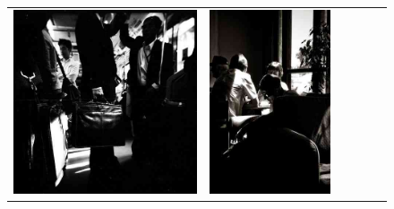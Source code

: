 \begin{figure}
\begin{tabular}{m{.01\linewidth} m{.16\linewidth} m{.16\linewidth} m{.16\linewidth} m{.16\linewidth} m{.16\linewidth}}
    \includegraphics[width=\linewidth]{../style/figures/flickr_on_flickr/pred_style_Noir/3.jpg} &
    \includegraphics[width=\linewidth]{../style/figures/flickr_on_flickr/pred_style_Noir/4.jpg}

\end{tabular}
\end{figure}
